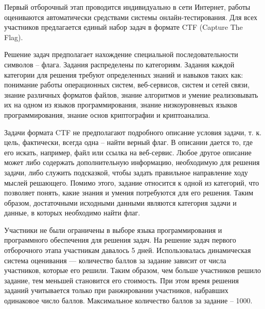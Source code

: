 Первый отборочный этап проводится индивидуально в сети Интернет, работы оцениваются автоматически средствами системы онлайн-тестирования. Для всех участников предлагается единый набор задач в формате CTF (Capture The Flag).

Решение задач предполагает нахождение специальной последовательности символов – флага. Задания распределены по категориям. Задания каждой категории для решения требуют определенных знаний и навыков таких как: понимание  работы операционных систем, веб-сервисов, систем и сетей связи, знание различных форматов файлов, знание алгоритмов и умение реализовывать их на одном из языков программирования, знание низкоуровневых языков программирования, знание основ криптографии и криптоанализа.

Задачи формата CTF не предполагают подробного описание условия задачи, т. к. цель, фактически, всегда одна – найти верный флаг. В описании дается то, где его искать, например, файл или ссылка на веб-сервис. Любое другое описание может либо содержать дополнительную информацию, необходимую для решения задачи, либо служить подсказкой, чтобы задать правильное направление ходу мыслей решающего. Помимо этого, задание относится к одной из категорий, что позволяет понять, какие знания и умения потребуются для его решения. Таким образом, достаточными исходными данными являются категория задачи и данные, в которых необходимо найти флаг.

Участники не были ограничены в выборе языка программирования и программного обеспечения для решения задач. На решение задач первого отборочного этапа участникам давалось 5 дней. Использовалась динамическая система оценивания — количество баллов за задание зависит от числа участников, которые его решили. Таким образом, чем больше участников решило задание, тем меньшей становится его стоимость. При этом время решения заданий учитывается только при ранжировании участников, набравших одинаковое число баллов. Максимальное количество баллов за задание – 1000.